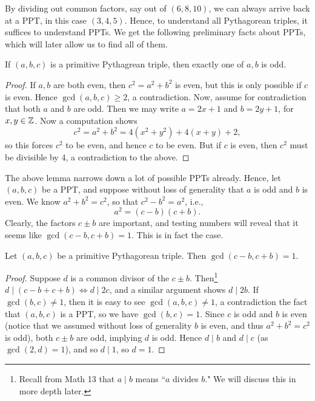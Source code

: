 \documentclass{article}
\begin{document}
By dividing out common factors, say out of $(6, 8, 10)$, we can always arrive back at a PPT, in this case $(3,4,5)$. Hence, to understand all Pythagorean triples, it suffices to understand PPTs. We get the following preliminary facts about PPTs, which will later allow us to find all of them.
\begin{lemma}\label{14.5 in notes}
If $(a,b,c)$ is a primitive Pythagrean triple, then exactly one of $a,b$ is odd.
\end{lemma}
\begin{proof}
If $a,b$ are both even, then $c^2 = a^2 + b^2$ is even, but this is only possible if $c$ is even. Hence $\gcd(a,b,c) \geq 2$, a contradiction. Now, assume for contradiction that both $a$ and $b$ are odd. Then we may write $a = 2x+1$ and $b = 2y+1$, for $x,y\in \mathbb Z$. Now a computation shows
$$c^2 = a^2 + b^2 = 4(x^2 + y^2) + 4(x+y) + 2,$$
so this forces $c^2$ to be even, and hence $c$ to be even. But if $c$ is even, then $c^2$ must be divisible by $4$, a contradiction to the above.
\end{proof}

The above lemma narrows down a lot of possible PPTs already. Hence, let $(a,b,c)$ be a PPT, and suppose without loss of generality that $a$ is odd and $b$ is even. We know $a^2 + b^2 = c^2$, so that $c^2 - b^2 = a^2$, i.e., 
$$a^2 = (c-b)(c+b).$$
Clearly, the factors $c\pm b$ are important, and testing numbers will reveal that it seems like $\gcd(c-b, c+b) = 1$. This is in fact the case.
\begin{lemma}\label{14.6 in notes}
Let $(a,b,c)$ be a primitive Pythagorean triple. Then $\gcd(c-b, c+b) = 1$.
\end{lemma}
\begin{proof}
Suppose $d$ is a common divisor of the $c\pm b$. Then\footnote{Recall from Math 13 that $a\mid b$ means ``$a$ divides $b$." We will discuss this in more depth later.} $d\mid (c-b + c+b) \iff d\mid 2c$, and a similar argument shows $d\mid 2b$. If $\gcd(b,c) \neq 1$, then it is easy to see $\gcd(a,b,c) \neq 1$, a contradiction the fact that $(a,b,c)$ is a PPT, so we have $\gcd(b,c) = 1$. Since $c$ is odd and $b$ is even (notice that we assumed without loss of generality $b$ is even, and thus $a^2 + b^2= c^2$ is odd), both $c\pm b$ are odd, implying $d$ is odd. Hence $d\mid b$ and $d\mid c$ (as $\gcd(2,d) = 1$), and so $d\mid 1$, so $d=1$.
\end{proof}
\end{document}
